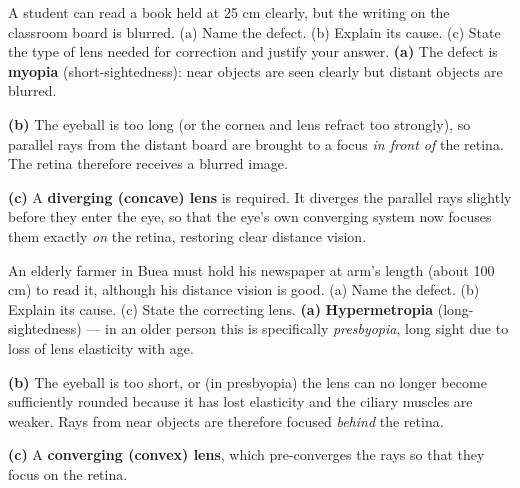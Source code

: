 \documentclass[11pt]{article}
\begin{document}
\begin{exoresolu}
A student can read a book held at 25 cm clearly, but the writing on the classroom board is blurred. (a) Name the defect. (b) Explain its cause. (c) State the type of lens needed for correction and justify your answer.
\tcblower
\textbf{(a)} The defect is \textbf{myopia} (short-sightedness): near objects are seen clearly but distant objects are blurred.\par
\textbf{(b)} The eyeball is too long (or the cornea and lens refract too strongly), so parallel rays from the distant board are brought to a focus \emph{in front of} the retina. The retina therefore receives a blurred image.\par
\textbf{(c)} A \textbf{diverging (concave) lens} is required. It diverges the parallel rays slightly before they enter the eye, so that the eye's own converging system now focuses them exactly \emph{on} the retina, restoring clear distance vision.
\end{exoresolu}

\begin{exoresolu}
An elderly farmer in Buea must hold his newspaper at arm's length (about 100 cm) to read it, although his distance vision is good. (a) Name the defect. (b) Explain its cause. (c) State the correcting lens.
\tcblower
\textbf{(a)} \textbf{Hypermetropia} (long-sightedness) --- in an older person this is specifically \emph{presbyopia}, long sight due to loss of lens elasticity with age.\par
\textbf{(b)} The eyeball is too short, or (in presbyopia) the lens can no longer become sufficiently rounded because it has lost elasticity and the ciliary muscles are weaker. Rays from near objects are therefore focused \emph{behind} the retina.\par
\textbf{(c)} A \textbf{converging (convex) lens}, which pre-converges the rays so that they focus on the retina.
\end{exoresolu}
\end{document}
